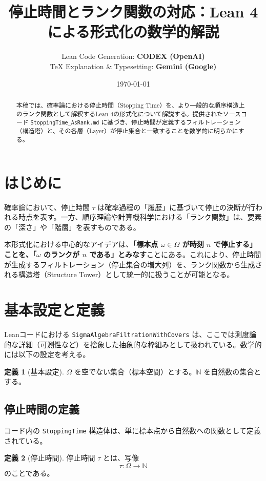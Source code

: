 \documentclass[a4paper,11pt]{ltjsarticle}
\title{\textbf{停止時間とランク関数の対応：Lean 4による形式化の数学的解説}}
\author{
    Lean Code Generation: \textbf{CODEX (OpenAI)} \\
    TeX Explanation \& Typesetting: \textbf{Gemini (Google)}
}
\date{\today}
\theoremstyle{definition}
\newtheorem{definition}{定義}[section]
\newcommand{\N}{\mathbb{N}}
\newcommand{\OmegaSpace}{\Omega}
\newcommand{\Tau}{\tau}
\newcommand{\code}[1]{\texttt{#1}}
\begin{document}
\maketitle

\begin{abstract}
本稿では、確率論における停止時間（Stopping Time）を、より一般的な順序構造上のランク関数として解釈するLean 4の形式化について解説する。提供されたソースコード \code{StoppingTime\_AsRank.md} に基づき、停止時間が定義するフィルトレーション（構造塔）と、その各層（Layer）が停止集合と一致することを数学的に明らかにする。
\end{abstract}

\tableofcontents

\section{はじめに}
確率論において、停止時間 $\Tau$ は確率過程の「履歴」に基づいて停止の決断が行われる時点を表す。一方、順序理論や計算機科学における「ランク関数」は、要素の「深さ」や「階層」を表すものである。

本形式化における中心的なアイデアは、\textbf{「標本点 $\omega \in \OmegaSpace$ が時刻 $n$ で停止する」ことを、「$\omega$ のランクが $n$ である」とみなす}ことにある。これにより、停止時間が生成するフィルトレーション（停止集合の増大列）を、ランク関数から生成される構造塔（Structure Tower）として統一的に扱うことが可能となる。

\section{基本設定と定義}

Leanコードにおける \code{SigmaAlgebraFiltrationWithCovers} は、ここでは測度論的な詳細（可測性など）を捨象した抽象的な枠組みとして扱われている。数学的には以下の設定を考える。

\begin{definition}[基本設定]
$\OmegaSpace$ を空でない集合（標本空間）とする。$\N$ を自然数の集合とする。
\end{definition}

\subsection{停止時間の定義}
コード内の \code{StoppingTime} 構造体は、単に標本点から自然数への関数として定義されている。

\begin{definition}[停止時間]
停止時間 $\Tau$ とは、写像
\[
    \Tau: \OmegaSpace \to \N
\]
のことである。
\end{definition}
\end{document}
